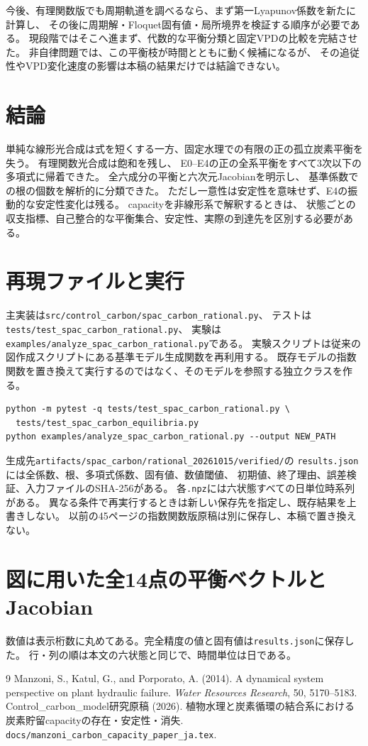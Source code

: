 \documentclass[a4paper,11pt]{ltjsarticle}
\newcommand{\code}[1]{\nolinkurl{#1}}
\begin{document}
今後、有理関数版でも周期軌道を調べるなら、まず第一Lyapunov係数を新たに計算し、
その後に周期解・Floquet固有値・局所境界を検証する順序が必要である。
現段階ではそこへ進まず、代数的な平衡分類と固定VPDの比較を完結させた。
非自律問題では、この平衡枝が時間とともに動く候補になるが、
その追従性やVPD変化速度の影響は本稿の結果だけでは結論できない。

\section{結論}
単純な線形光合成は式を短くする一方、固定水理での有限の正の孤立炭素平衡を失う。
有理関数光合成は飽和を残し、
E0--E4の正の全系平衡をすべて3次以下の多項式に帰着できた。
全六成分の平衡と六次元Jacobianを明示し、
基準係数での根の個数を解析的に分類できた。
ただし一意性は安定性を意味せず、E4の振動的な安定性変化は残る。
capacityを非線形系で解釈するときは、
状態ごとの収支指標、自己整合的な平衡集合、安定性、実際の到達先を区別する必要がある。

\appendix
\section{再現ファイルと実行}
主実装は\code{src/control_carbon/spac_carbon_rational.py}、
テストは\code{tests/test_spac_carbon_rational.py}、
実験は\code{examples/analyze_spac_carbon_rational.py}である。
実験スクリプトは従来の図作成スクリプトにある基準モデル生成関数を再利用する。
既存モデルの指数関数を置き換えて実行するのではなく、そのモデルを参照する独立クラスを作る。
\begin{verbatim}
python -m pytest -q tests/test_spac_carbon_rational.py \
  tests/test_spac_carbon_equilibria.py
python examples/analyze_spac_carbon_rational.py --output NEW_PATH
\end{verbatim}
生成先\code{artifacts/spac_carbon/rational_20261015/verified/}の
\code{results.json}には全係数、根、多項式係数、固有値、数値閾値、
初期値、終了理由、誤差検証、入力ファイルのSHA-256がある。
各\code{.npz}には六状態すべての日単位時系列がある。
異なる条件で再実行するときは新しい保存先を指定し、既存結果を上書きしない。
以前の45ページの指数関数版原稿は別に保存し、本稿で置き換えない。

\clearpage
\section{図に用いた全14点の平衡ベクトルとJacobian}
数値は表示桁数に丸めてある。完全精度の値と固有値は\code{results.json}に保存した。
行・列の順は本文の六状態と同じで、時間単位は日である。
\begin{landscape}

\end{landscape}

\begin{thebibliography}{9}
Manzoni, S., Katul, G., and Porporato, A. (2014).
A dynamical system perspective on plant hydraulic failure.
\textit{Water Resources Research}, 50, 5170--5183.
Control\_carbon\_model研究原稿 (2026).
植物水理と炭素循環の結合系における炭素貯留capacityの存在・安定性・消失.
\code{docs/manzoni_carbon_capacity_paper_ja.tex}.
\end{thebibliography}
\end{document}
